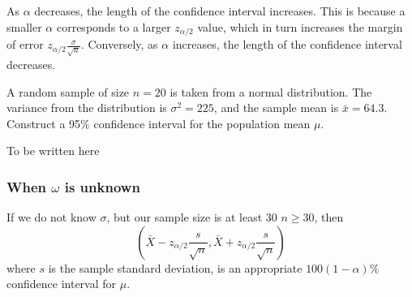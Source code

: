 \documentclass[11pt]{article}
\begin{document}
\begin{theorem}
	As $\alpha$ decreases, the length of the confidence interval increases. This is because a smaller $\alpha$ corresponds to a larger $z_{\alpha/2}$ value, which in turn increases the margin of error $z_{\alpha/2} \frac{\sigma}{\sqrt{n}}$. Conversely, as $\alpha$ increases, the length of the confidence interval decreases.
\end{theorem}
\begin{example}
    A random sample of size $n = 20$ is taken from a normal distribution. The variance from the distribution is $\sigma^2 = 225$, and the sample mean is $\bar{x} = 64.3$. Construct a 95\% confidence interval for the population mean $\mu$.
\end{example}

\begin{solution}
    To be written here
\end{solution}

\subsubsection{When \(\omega\) is unknown}
\begin{theorem}
    If we do not know \(\sigma\), but our sample size is at least 30 \(n \geq 30\), then
    \[ \left( \bar{X} - z_{\alpha/2} \frac{s}{\sqrt{n}}, \bar{X} + z_{\alpha/2} \frac{s}{\sqrt{n}} \right) \]
    where \(s\) is the sample standard deviation,
    is an appropriate \(100(1 - \alpha)\%\) confidence interval for \(\mu\).
\end{theorem}
\end{document}
